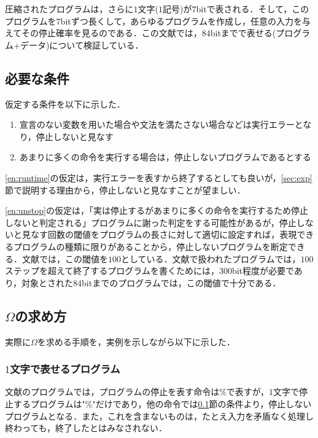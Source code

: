 \documentclass{jarticle}
\begin{document}
圧縮されたプログラムは，さらに$1$文字($1$記号)が$7$bitで表される．そして，このプログラムを$7$bitずつ長くして，あらゆるプログラムを作成し，任意の入力を与えてその停止確率を見るのである．この文献では，$84$bitまでで表せる(プログラム+データ)について検証している．



\subsection{必要な条件}
\label{sec:condition}
仮定する条件を以下に示した．
\begin{enumerate}
	\item 宣言のない変数を用いた場合や文法を満たさない場合などは実行エラーとなり，停止しないと見なす
		\label{en:runtime}
	\item あまりに多くの命令を実行する場合は，停止しないプログラムであるとする
		\label{en:unstop}
\end{enumerate}

\ref{en:runtime}の仮定は，実行エラーを表すから終了するとしても良いが，\ref{sec:exp}節で説明する理由から，停止しないと見なすことが望ましい．

\ref{en:unstop}の仮定は，「実は停止するがあまりに多くの命令を実行するため停止しないと判定される」プログラムに謝った判定をする可能性があるが，停止しないと見なす回数の閾値をプログラムの長さに対して適切に設定すれば，表現できるプログラムの種類に限りがあることから，停止しないプログラムを断定できる．文献\cite{ref:omega}では，この閾値を$100$としている．文献で扱われたプログラムでは，$100$ステップを超えて終了するプログラムを書くためには，$300$bit程度が必要であり，対象とされた$84$bitまでのプログラムでは，この閾値で十分である．


\subsection{$\Omega$の求め方}
実際に$\Omega$を求める手順を，実例を示しながら以下に示した．

\subsubsection{$1$文字で表せるプログラム}
文献のプログラムでは，プログラムの停止を表す命令は\%で表すが，$1$文字で停止するプログラムは"\%"だけであり，他の命令では\ref{sec:condition}節の条件より，停止しないプログラムとなる．また，これを含まないものは，たとえ入力を矛盾なく処理し終わっても，終了したとはみなされない．

\end{document}
